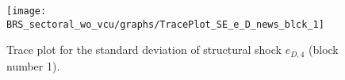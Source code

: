 \begin{figure}[H]
\centering
  \texttt{[image: BRS\_sectoral\_wo\_vcu/graphs/TracePlot\_SE\_e\_D\_news\_blck\_1]}\\
    \caption{Trace plot for the standard deviation of structural shock ${e_{D,4}}$ (block number 1).}
\end{figure}
